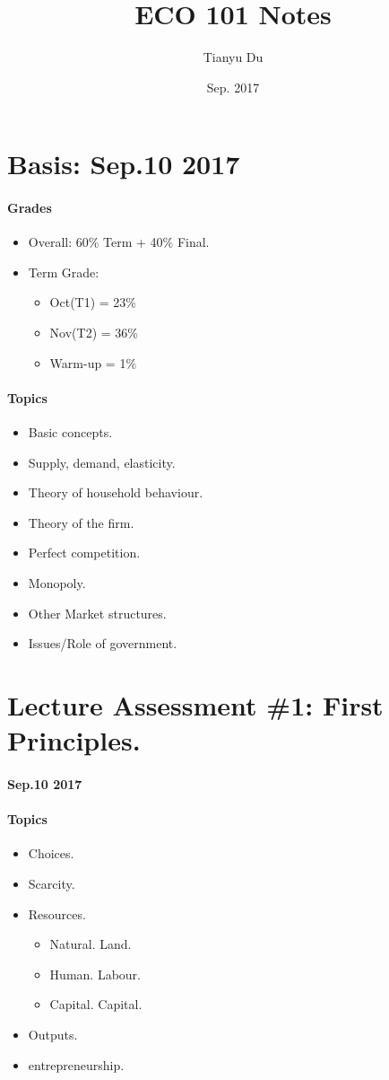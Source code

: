 \documentclass{article}
\author{Tianyu Du}
\date{Sep. 2017}
\title{ECO 101 Notes}
\begin{document}
	\maketitle
	\tableofcontents
	\section{Basis: Sep.10 2017}
	\paragraph{Grades}\quad
	\begin{itemize}
	\item Overall: 60\% Term + 40\% Final.
	\item Term Grade:
	\begin{itemize}
		\item Oct(T1) = 23\%
		\item Nov(T2) = 36\%
		\item Warm-up = 1\%
	\end{itemize}
	\end{itemize}
	\paragraph{Topics}\quad
	\begin{itemize}
		\item Basic concepts.
		\item Supply, demand, elasticity. 
		\item Theory of household behaviour. 
		\item Theory of the firm. 
		\item Perfect competition.
		\item Monopoly.
		\item Other Market structures. 
		\item Issues/Role of government.
	\end{itemize}
	\section{Lecture Assessment \#1: First Principles.}
	\paragraph{Sep.10 2017}
	\paragraph{Topics}
	\begin{itemize}
		\item Choices. 
		\item Scarcity. 
		\item Resources. 
			\begin{itemize}
				\item Natural. Land.
				\item Human. Labour.
				\item Capital. Capital.
			\end{itemize}
		\item Outputs. 
		\item entrepreneurship.
	\end{itemize}
\end{document}
